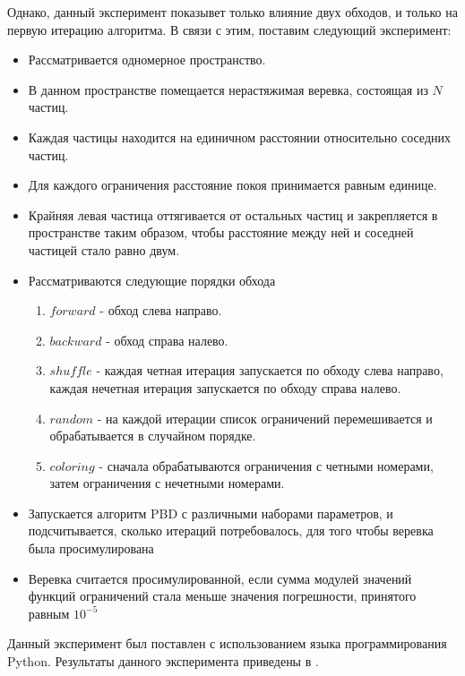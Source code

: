 	Однако, данный эксперимент показывет только влияние двух обходов, и только на первую итерацию алгоритма. В связи с этим, поставим следующий эксперимент:
	
	\begin{itemize}
		\item Рассматривается одномерное пространство.
		\item В данном пространстве помещается нерастяжимая веревка, состоящая из $N$ частиц.
		\item Каждая частицы находится на единичном расстоянии относительно соседних частиц.
		\item Для каждого ограничения расстояние покоя принимается равным единице.
		\item Крайняя левая частица оттягивается от остальных частиц и закрепляется в пространстве таким образом, чтобы расстояние между ней и соседней частицей стало равно двум.
		\item Рассматриваются следующие порядки обхода
			\begin{enumerate}[1.]
				\item $forward$ - обход слева направо.
				\item $backward$ - обход справа налево.
				\item $shuffle$ - каждая четная итерация запускается по обходу слева направо, каждая нечетная итерация запускается по обходу справа налево.
				\item $random$ - на каждой итерации список ограничений перемешивается и обрабатывается в случайном порядке.
				\item $coloring$ - сначала обрабатываются ограничения с четными номерами, затем ограничения с нечетными номерами.
			\end{enumerate}
		\item Запускается алгоритм PBD с различными наборами параметров, и подсчитывается, сколько итераций потребовалось, для того чтобы веревка была просимулирована
		\item Веревка считается просимулированной, если сумма модулей значений функций ограничений стала меньше значения погрешности, принятого равным $10^{-5}$
	\end{itemize}
	
	Данный эксперимент был поставлен с использованием языка программирования Python. Результаты данного эксперимента приведены в .
	
